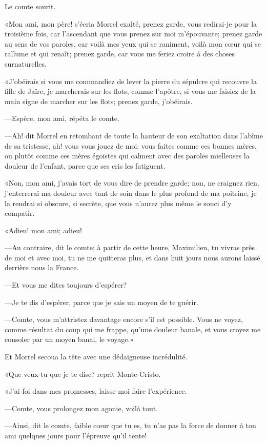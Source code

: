 Le comte sourit. 

«Mon ami, mon père! s'écria Morrel exalté, prenez garde, vous redirai-je pour la troisième fois, car l'ascendant que vous prenez sur moi m'épouvante; prenez garde au sens de vos paroles, car voilà mes yeux qui se raniment, voilà mon cœur qui se rallume et qui renaît; prenez garde, car vous me feriez croire à des choses surnaturelles. 

«J'obéirais si vous me commandiez de lever la pierre du sépulcre qui recouvre la fille de Jaïre, je marcherais sur les flots, comme l'apôtre, si vous me faisiez de la main signe de marcher sur les flots; prenez garde, j'obéirais. 

—Espère, mon ami, répéta le comte. 

—Ah! dit Morrel en retombant de toute la hauteur de son exaltation dans l'abîme de sa tristesse, ah! vous vous jouez de moi: vous faites comme ces bonnes mères, ou plutôt comme ces mères égoïstes qui calment avec des paroles mielleuses la douleur de l'enfant, parce que ses cris les fatiguent. 

«Non, mon ami, j'avais tort de vous dire de prendre garde; non, ne craignez rien, j'enterrerai ma douleur avec tant de soin dans le plus profond de ma poitrine, je la rendrai si obscure, si secrète, que vous n'aurez plus même le souci d'y compatir. 

«Adieu! mon ami; adieu! 

—Au contraire, dit le comte; à partir de cette heure, Maximilien, tu vivras près de moi et avec moi, tu ne me quitteras plus, et dans huit jours nous aurons laissé derrière nous la France. 

—Et vous me dites toujours d'espérer? 

—Je te dis d'espérer, parce que je sais un moyen de te guérir. 

—Comte, vous m'attristez davantage encore s'il est possible. Vous ne voyez, comme résultat du coup qui me frappe, qu'une douleur banale, et vous croyez me consoler par un moyen banal, le voyage.» 

Et Morrel secoua la tête avec une dédaigneuse incrédulité. 

«Que veux-tu que je te dise? reprit Monte-Cristo. 

«J'ai foi dans mes promesses, laisse-moi faire l'expérience. 

—Comte, vous prolongez mon agonie, voilà tout. 

—Ainsi, dit le comte, faible cœur que tu es, tu n'as pas la force de donner à ton ami quelques jours pour l'épreuve qu'il tente! 

